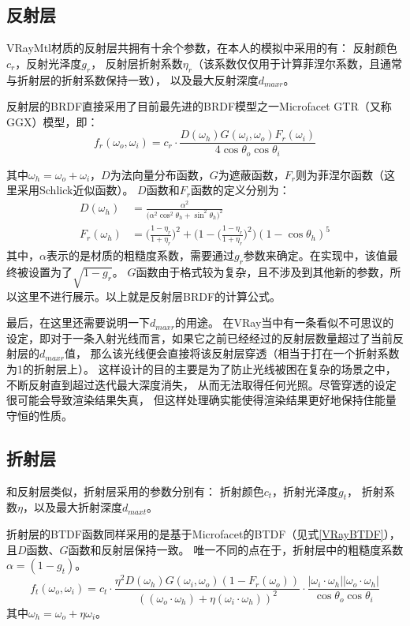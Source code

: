 \subsection{反射层}

VRayMtl材质的反射层共拥有十余个参数，在本人的模拟中采用的有：
反射颜色$c_{r}$，反射光泽度$g_r$，
反射层折射系数$\eta_{r}$（该系数仅仅用于计算菲涅尔系数，且通常与折射层的折射系数保持一致），
以及最大反射深度$d_{maxr}$。

反射层的BRDF直接采用了目前最先进的BRDF模型之一Microfacet GTR（又称GGX）模型\cite{GTR}，即：
\begin{equation}
f_r(\omega_o, \omega_i) = c_r \cdot \frac{D(\omega_h)G(\omega_i,\omega_o)F_r(\omega_i)}{4\cos\theta_o\cos\theta_i} 
\end{equation}

其中$\omega_h=\omega_o+\omega_i$，$D$为法向量分布函数，$G$为遮蔽函数，$F_r$则为菲涅尔函数（这里采用Schlick近似函数）。
$D$函数和$F_r$函数的定义分别为：
\begin{align}
D(\omega_h) &= \frac{\alpha^2}{\Big(\alpha^2\cos^2\theta_h + \sin^2\theta_h\Big)^2}\\
F_r(\omega_h) &= \Big(\frac{1-\eta_r}{1+\eta_r}\Big)^2+\Big(1-\Big(\frac{1-\eta_r}{1+\eta_r}\Big)^2\Big)(1-\cos\theta_h)^5
\end{align}
其中，$\alpha$表示的是材质的粗糙度系数，需要通过$g_r$参数来确定。在实现中，该值最终被设置为了$\sqrt{1-g_r}$。
$G$函数由于格式较为复杂，且不涉及到其他新的参数，所以这里不进行展示。以上就是反射层BRDF的计算公式。

最后，在这里还需要说明一下$d_{maxr}$的用途。
在VRay当中有一条看似不可思议的设定，即对于一条入射光线而言，如果它之前已经经过的反射层数量超过了当前反射层的$d_{maxr}$值，
那么该光线便会直接将该反射层穿透（相当于打在一个折射系数为1的折射层上）。
这样设计的目的主要是为了防止光线被困在复杂的场景之中，不断反射直到超过迭代最大深度消失，
从而无法取得任何光照。尽管穿透的设定很可能会导致渲染结果失真，
但这样处理确实能使得渲染结果更好地保持住能量守恒的性质。

\subsection{折射层}

和反射层类似，折射层采用的参数分别有：
折射颜色$c_t$，折射光泽度$g_t$，
折射系数$\eta$，以及最大折射深度$d_{maxt}$。

折射层的BTDF函数同样采用的是基于Microfacet的BTDF\cite{MicrofacetBTDF}（见式\ref{VRayBTDF}），且$D$函数、$G$函数和反射层保持一致。
唯一不同的点在于，折射层中的粗糙度系数$\alpha=(1-g_t)$。
\begin{equation}
    \label{VRayBTDF}
    f_t(\omega_o, \omega_i) = c_t \cdot \frac{\eta^2 D(\omega_h)G(\omega_i,\omega_o)(1-F_r(\omega_o))}{((\omega_o\cdot\omega_h) + \eta (\omega_i\cdot\omega_h))^2}\cdot \frac{|\omega_i\cdot\omega_h||\omega_o\cdot\omega_h|}{\cos\theta_o\cos\theta_i} 
\end{equation}
其中$\omega_h=\omega_o+\eta\omega_i$。

